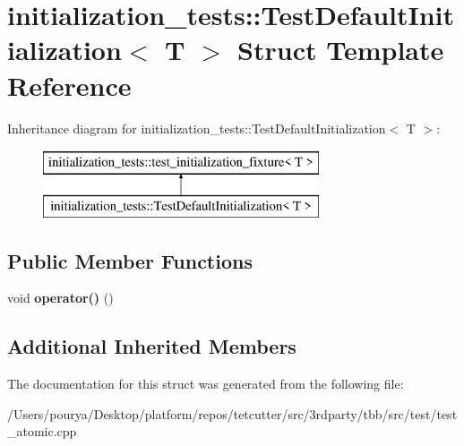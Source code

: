 \hypertarget{structinitialization__tests_1_1TestDefaultInitialization}{}\section{initialization\+\_\+tests\+:\+:Test\+Default\+Initialization$<$ T $>$ Struct Template Reference}
\label{structinitialization__tests_1_1TestDefaultInitialization}
Inheritance diagram for initialization\+\_\+tests\+:\+:Test\+Default\+Initialization$<$ T $>$\+:\begin{figure}[H]
\begin{center}
\leavevmode
\includegraphics[height=2.000000cm]{structinitialization__tests_1_1TestDefaultInitialization}
\end{center}
\end{figure}
\subsection*{Public Member Functions}
\begin{DoxyCompactItemize}
\item 
\hypertarget{structinitialization__tests_1_1TestDefaultInitialization_aace0f5f161de87493aecc1378a5dafae}{}void {\bfseries operator()} ()\label{structinitialization__tests_1_1TestDefaultInitialization_aace0f5f161de87493aecc1378a5dafae}

\end{DoxyCompactItemize}
\subsection*{Additional Inherited Members}


The documentation for this struct was generated from the following file\+:\begin{DoxyCompactItemize}
\item 
/\+Users/pourya/\+Desktop/platform/repos/tetcutter/src/3rdparty/tbb/src/test/test\+\_\+atomic.\+cpp\end{DoxyCompactItemize}
